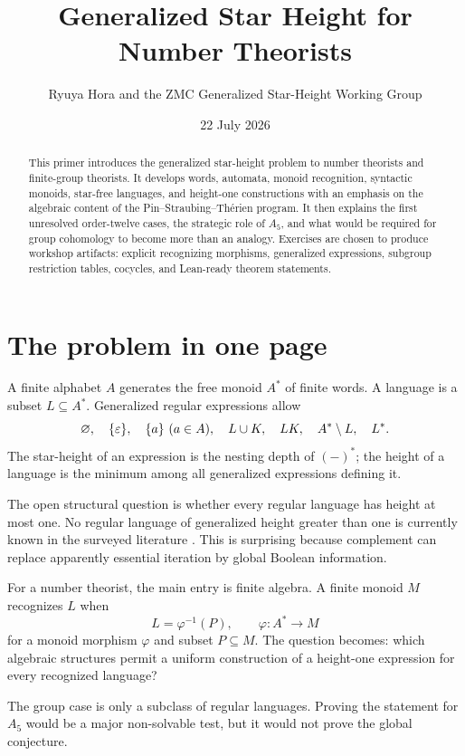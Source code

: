 \documentclass{amsart}
\title{Generalized Star Height for Number Theorists}
\author{Ryuya Hora and the ZMC Generalized Star-Height Working Group}
\date{22 July 2026}
\begin{document}
\begin{abstract}
This primer introduces the generalized star-height problem to number theorists and finite-group theorists.  It develops words, automata, monoid recognition, syntactic monoids, star-free languages, and height-one constructions with an emphasis on the algebraic content of the Pin--Straubing--Th\'erien program.  It then explains the first unresolved order-twelve cases, the strategic role of $A_5$, and what would be required for group cohomology to become more than an analogy.  Exercises are chosen to produce workshop artifacts: explicit recognizing morphisms, generalized expressions, subgroup restriction tables, cocycles, and Lean-ready theorem statements.
\end{abstract}
\maketitle
\tableofcontents

\section{The problem in one page}

A finite alphabet $A$ generates the free monoid $A^\ast$ of finite words.  A language is a subset $L\subseteq A^\ast$.  Generalized regular expressions allow
\[
\varnothing,\quad \{\varepsilon\},\quad \{a\}\ (a\in A),\quad
L\cup K,\quad LK,\quad A^\ast\setminus L,\quad L^\ast.
\]
The star-height of an expression is the nesting depth of $(-)^\ast$; the height of a language is the minimum among all generalized expressions defining it.

The open structural question is whether every regular language has height at most one.  No regular language of generalized height greater than one is currently known in the surveyed literature \cite{pinStraubingTherien1992,bourne2017counting,placeZeitoun2017generic}.  This is surprising because complement can replace apparently essential iteration by global Boolean information.

For a number theorist, the main entry is finite algebra.  A finite monoid $M$ recognizes $L$ when
\[
  L=\varphi^{-1}(P),\qquad
  \varphi:A^\ast\longrightarrow M
\]
for a monoid morphism $\varphi$ and subset $P\subseteq M$.  The question becomes: which algebraic structures permit a uniform construction of a height-one expression for every recognized language?

\begin{warning}
The group case is only a subclass of regular languages.  Proving the statement for $A_5$ would be a major non-solvable test, but it would not prove the global conjecture.
\end{warning}
\end{document}
